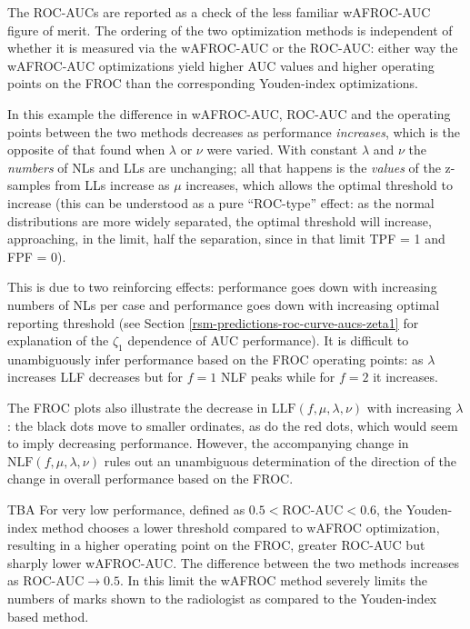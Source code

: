 \documentclass[
]{book}
\begin{document}
The ROC-AUCs are reported as a check of the less familiar wAFROC-AUC figure of merit. The ordering of the two optimization methods is independent of whether it is measured via the wAFROC-AUC or the ROC-AUC: either way the wAFROC-AUC optimizations yield higher AUC values and higher operating points on the FROC than the corresponding Youden-index optimizations.

In this example the difference in wAFROC-AUC, ROC-AUC and the operating points between the two methods decreases as performance \emph{increases}, which is the opposite of that found when \(\lambda\) or \(\nu\) were varied. With constant \(\lambda\) and \(\nu\) the \emph{numbers} of NLs and LLs are unchanging; all that happens is the \emph{values} of the z-samples from LLs increase as \(\mu\) increases, which allows the optimal threshold to increase (this can be understood as a pure ``ROC-type'' effect: as the normal distributions are more widely separated, the optimal threshold will increase, approaching, in the limit, half the separation, since in that limit TPF = 1 and FPF = 0).

This is due to two reinforcing effects: performance goes down with increasing numbers of NLs per case and performance goes down with increasing optimal reporting threshold (see Section \ref{rsm-predictions-roc-curve-aucs-zeta1} for explanation of the \(\zeta_1\) dependence of AUC performance). It is difficult to unambiguously infer performance based on the FROC operating points: as \(\lambda\) increases LLF decreases but for \(f = 1\) NLF peaks while for \(f = 2\) it increases.

The FROC plots also illustrate the decrease in \(\text{LLF} \left ( f, \mu, \lambda, \nu \right )\) with increasing \(\lambda\): the black dots move to smaller ordinates, as do the red dots, which would seem to imply decreasing performance. However, the accompanying change in \(\text{NLF} \left ( f, \mu, \lambda, \nu \right )\) rules out an unambiguous determination of the direction of the change in overall performance based on the FROC.

TBA For very low performance, defined as \(0.5 < \text{ROC-AUC} < 0.6\), the Youden-index method chooses a lower threshold compared to wAFROC optimization, resulting in a higher operating point on the FROC, greater ROC-AUC but sharply lower wAFROC-AUC. The difference between the two methods increases as \(\text{ROC-AUC} \rightarrow 0.5\). In this limit the wAFROC method severely limits the numbers of marks shown to the radiologist as compared to the Youden-index based method.
\end{document}

